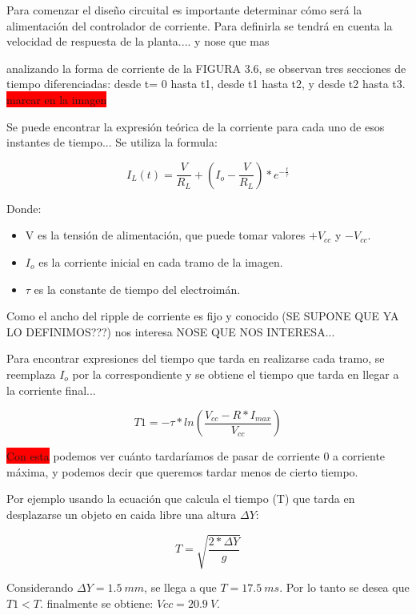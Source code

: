 Para comenzar el diseño circuital es importante determinar cómo será la alimentación del controlador de corriente. Para definirla se tendrá en cuenta la velocidad de respuesta de la planta.... y nose que mas

analizando la forma de corriente de la FIGURA 3.6, se observan tres secciones de tiempo diferenciadas: desde t= 0 hasta t1, desde t1 hasta t2,  y desde t2 hasta t3. \colorbox{red}{marcar en la imagen}

Se puede encontrar la expresión teórica de la corriente para cada uno de esos instantes de tiempo... Se utiliza la formula:

\begin{equation}
	I_L(t)=\frac{V}{R_L} + (I_o-\frac{V}{R_L})*e^{-\frac{t}{\tau}}
\end{equation} 

Donde:
\begin{itemize}
	\item V es la tensión de alimentación, que puede tomar valores $+V_{cc}$ y $-V_{cc}$.
	\item $I_o$ es la corriente inicial en cada tramo de la imagen.
	\item $\tau$ es la constante de tiempo del electroimán.
\end{itemize}

Como el ancho del ripple de corriente es fijo y conocido (SE SUPONE QUE YA LO DEFINIMOS???) nos interesa NOSE QUE NOS INTERESA...



Para encontrar expresiones del tiempo que tarda en realizarse cada tramo, se reemplaza $I_o$ por la correspondiente y se obtiene el tiempo que tarda en llegar a la corriente final...


\begin{equation}
		T1=-\tau*ln(\frac{V_{cc}-R*I_{max}}{V_{cc}})
\end{equation}


\colorbox{red}{Con esta} podemos ver cuánto tardaríamos de pasar de corriente 0 a corriente máxima, y podemos decir que queremos tardar menos de cierto tiempo.


Por ejemplo usando la ecuación que calcula el tiempo (T) que tarda en desplazarse un objeto en caida libre una altura $\Delta Y$:

\begin{equation}
	T=\sqrt{\frac{2*\Delta Y}{g}}
\end{equation}

Considerando $\Delta Y=1.5\:mm$, se llega a que $T=17.5\:ms$. Por lo tanto se desea que $T1<T$.
finalmente se obtiene: $Vcc=20.9\:V$.



